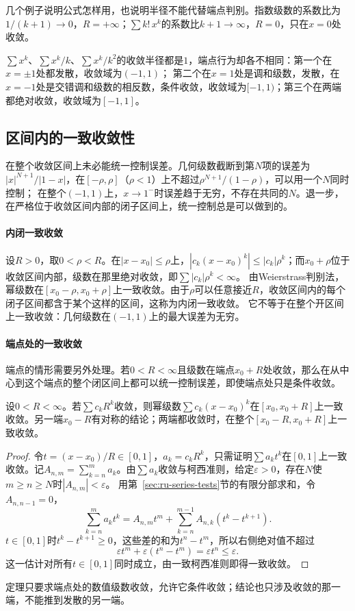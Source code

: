 几个例子说明公式怎样用，也说明半径不能代替端点判别。指数级数的系数比为$1/(k+1)\to0$，$R=+\infty$；$\sum k!\,x^k$的系数比$k+1\to\infty$，$R=0$，只在$x=0$处收敛。
\begin{example}[收敛半径相同而端点行为不同]
\label{ex:ru-same-radius-different-endpoints}
$\sum x^k$、$\sum x^k/k$、$\sum x^k/k^2$的收敛半径都是$1$，端点行为却各不相同：第一个在$x=\pm1$处都发散，收敛域为$(-1,1)$；
第二个在$x=1$处是调和级数，发散，在$x=-1$处是交错调和级数的相反数，条件收敛，收敛域为$[-1,1)$；第三个在两端都绝对收敛，收敛域为$[-1,1]$。
\end{example}

\subsection{区间内的一致收敛性}
\label{sec:ru-power-series-uniform}

在整个收敛区间上未必能统一控制误差。几何级数截断到第$N$项的误差为$|x|^{N+1}/|1-x|$，在$[-\rho,\rho]$（$\rho<1$）上不超过$\rho^{N+1}/(1-\rho)$，可以用一个$N$同时控制；
在整个$(-1,1)$上，$x\to1^-$时误差趋于无穷，不存在共同的$N$。退一步，在严格位于收敛区间内部的闭子区间上，统一控制总是可以做到的。

\paragraph{内闭一致收敛}
设$R>0$，取$0<\rho<R$。在$|x-x_0|\leq\rho$上，$|c_k(x-x_0)^k|\leq|c_k|\rho^k$；而$x_0+\rho$位于收敛区间内部，级数在那里绝对收敛，即$\sum|c_k|\rho^k<\infty$。
由Weierstrass判别法，幂级数在$[x_0-\rho,x_0+\rho]$上一致收敛。由于$\rho$可以任意接近$R$，收敛区间内的每个闭子区间都含于某个这样的区间，这称为内闭一致收敛。
它不等于在整个开区间上一致收敛：几何级数在$(-1,1)$上的最大误差为无穷。

\paragraph{端点处的一致收敛}
端点的情形需要另外处理。若$0<R<\infty$且级数在端点$x_0+R$处收敛，那么在从中心到这个端点的整个闭区间上都可以统一控制误差，即使端点处只是条件收敛。
\begin{theorem}[Abel第二定理]
\label{thm:ru-abel-endpoint}
设$0<R<\infty$。若$\sum c_kR^k$收敛，则幂级数$\sum c_k(x-x_0)^k$在$[x_0,x_0+R]$上一致收敛。另一端$x_0-R$有对称的结论；两端都收敛时，在整个$[x_0-R,x_0+R]$上一致收敛。
\end{theorem}
\begin{proof}
令$t=(x-x_0)/R\in[0,1]$，$a_k=c_kR^k$，只需证明$\sum a_kt^k$在$[0,1]$上一致收敛。记$A_{n,m}=\sum_{k=n}^ma_k$。由$\sum a_k$收敛与柯西准则，给定$\varepsilon>0$，存在$N$使$m\geq n\geq N$时$|A_{n,m}|<\varepsilon$。
用第~\ref{sec:ru-series-tests}节的有限分部求和，令$A_{n,n-1}=0$，
\[
 \sum_{k=n}^ma_kt^k=A_{n,m}t^m+\sum_{k=n}^{m-1}A_{n,k}(t^k-t^{k+1}).
\]
$t\in[0,1]$时$t^k-t^{k+1}\geq0$，这些差的和为$t^n-t^m$，所以右侧绝对值不超过
\[
 \varepsilon t^m+\varepsilon(t^n-t^m)=\varepsilon t^n\leq\varepsilon.
\]
这一估计对所有$t\in[0,1]$同时成立，由一致柯西准则即得一致收敛。
\end{proof}
定理只要求端点处的数值级数收敛，允许它条件收敛；结论也只涉及收敛的那一端，不能推到发散的另一端。

